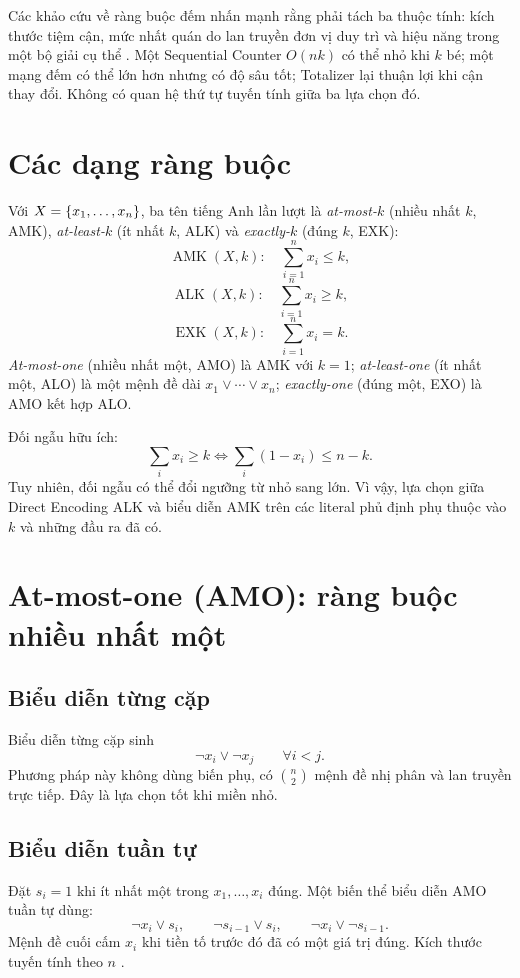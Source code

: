 Các khảo cứu về ràng buộc đếm nhấn mạnh rằng phải tách ba thuộc tính: kích
thước tiệm cận, mức nhất quán do lan truyền đơn vị duy trì và hiệu năng trong
một bộ giải cụ thể \parencite{bailleux2010survey}. Một Sequential Counter
\(O(nk)\) có thể nhỏ khi \(k\) bé; một mạng đếm có thể lớn hơn nhưng có độ sâu
tốt; Totalizer lại thuận lợi khi cận thay đổi. Không có quan hệ thứ tự tuyến
tính giữa ba lựa chọn đó.

\section{Các dạng ràng buộc}

Với \(X=\left\{x_1,\ldots,x_n\right\}\), ba tên tiếng Anh lần lượt là
\emph{at-most-\(k\)} (nhiều nhất \(k\), AMK), \emph{at-least-\(k\)}
(ít nhất \(k\), ALK) và \emph{exactly-\(k\)} (đúng \(k\), EXK):
\[
  \operatorname{AMK}(X,k):\quad \sum_{i=1}^{n}x_i\le k,
\]
\[
  \operatorname{ALK}(X,k):\quad \sum_{i=1}^{n}x_i\ge k,
\]
\[
  \operatorname{EXK}(X,k):\quad \sum_{i=1}^{n}x_i=k.
\]
\emph{At-most-one} (nhiều nhất một, AMO) là AMK với \(k=1\);
\emph{at-least-one} (ít nhất một, ALO) là một mệnh đề dài
\(x_1\lor\cdots\lor x_n\); \emph{exactly-one} (đúng một, EXO) là AMO kết hợp ALO.

Đối ngẫu hữu ích:
\[
  \sum_i x_i\ge k
  \iff
  \sum_i(1-x_i)\le n-k.
\]
Tuy nhiên, đối ngẫu có thể đổi ngưỡng từ nhỏ sang lớn. Vì vậy, lựa chọn giữa
Direct Encoding ALK và biểu diễn AMK trên các literal phủ định phụ thuộc vào
\(k\) và những đầu ra đã có.

\section{At-most-one (AMO): ràng buộc nhiều nhất một}

\subsection{Biểu diễn từng cặp}

Biểu diễn từng cặp sinh
\[
  \neg x_i\lor\neg x_j
  \qquad\forall i<j.
\]
Phương pháp này không dùng biến phụ, có \(\binom n2\) mệnh đề nhị phân và lan truyền trực
tiếp. Đây là lựa chọn tốt khi miền nhỏ.

\subsection{Biểu diễn tuần tự}

Đặt \(s_i=1\) khi ít nhất một trong \(x_1,\ldots,x_i\) đúng. Một biến thể
biểu diễn AMO tuần tự dùng:
\[
  \neg x_i\lor s_i,
  \qquad
  \neg s_{i-1}\lor s_i,
  \qquad
  \neg x_i\lor\neg s_{i-1}.
\]
Mệnh đề cuối cấm \(x_i\) khi tiền tố trước đó đã có một giá trị đúng. Kích thước
tuyến tính theo \(n\) \parencite{sinz2005cardinality}.

